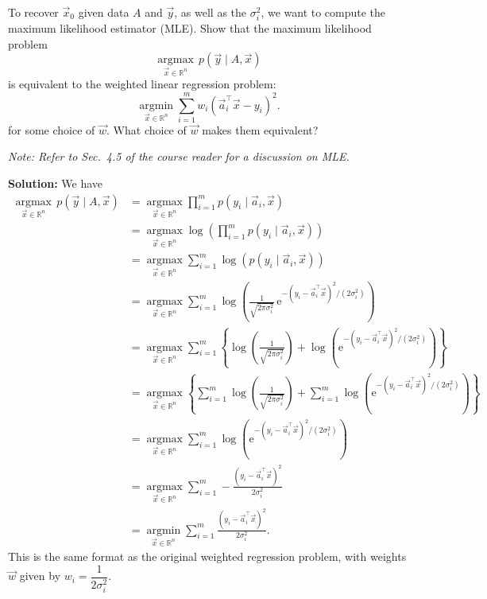 \documentclass[10pt]{article}
\newcommand{\RR}{\mathbb{R}}
\begin{document}
\begin{enumerate}[label=(\alph*)]
    To recover $\vec{x}_0$ given data $A$ and $\vec{y}$, as well as the $\sigma_i^2$, we want to compute the maximum likelihood estimator (MLE). Show that the maximum likelihood problem
    \begin{equation}
        \operatorname*{argmax}_{\vec{x} \in \RR^n}\, p(\vec{y} \mid A, \vec{x})
    \end{equation}
    is equivalent to the weighted linear regression problem:
    \begin{equation}
        \operatorname*{argmin}_{\vec{x} \in \RR^n} \sum_{i=1}^{m} w_i (\vec{a}_i^\top \vec{x} - y_i)^2.
    \end{equation}
    for some choice of $\vec{w}$. What choice of $\vec{w}$ makes them equivalent?

    \emph{Note: Refer to Sec.~4.5 of the course reader for a discussion on MLE.}

    \textbf{Solution:} We have
    \begin{align}
        \operatorname*{argmax}_{\vec{x} \in \RR^n}\, p(\vec{y} \mid A, \vec{x})
        &= \operatorname*{argmax}_{\vec{x} \in \RR^n} \prod_{i=1}^{m} p(y_i \mid \vec{a}_i, \vec{x}) \\
        &= \operatorname*{argmax}_{\vec{x} \in \RR^n} \log \left( \prod_{i=1}^{m} p(y_i \mid \vec{a}_i, \vec{x}) \right) \\
        &= \operatorname*{argmax}_{\vec{x} \in \RR^n} \sum_{i=1}^{m} \log(p(y_i \mid \vec{a}_i, \vec{x})) \\
        &= \operatorname*{argmax}_{\vec{x} \in \RR^n} \sum_{i=1}^{m} \log\!\left( \frac{1}{\sqrt{2\pi\sigma_i^2}}\, \mathrm{e}^{-(y_i - \vec{a}_i^\top \vec{x})^2 / (2\sigma_i^2)} \right) \\
        &= \operatorname*{argmax}_{\vec{x} \in \RR^n} \sum_{i=1}^{m} \left\{ \log\!\left( \frac{1}{\sqrt{2\pi\sigma_i^2}} \right) + \log\!\left( \mathrm{e}^{-(y_i - \vec{a}_i^\top \vec{x})^2 / (2\sigma_i^2)} \right) \right\} \\
        &= \operatorname*{argmax}_{\vec{x} \in \RR^n} \left\{ \sum_{i=1}^{m} \log\!\left( \frac{1}{\sqrt{2\pi\sigma_i^2}} \right) + \sum_{i=1}^{m} \log\!\left( \mathrm{e}^{-(y_i - \vec{a}_i^\top \vec{x})^2 / (2\sigma_i^2)} \right) \right\} \\
        &= \operatorname*{argmax}_{\vec{x} \in \RR^n} \sum_{i=1}^{m} \log\!\left( \mathrm{e}^{-(y_i - \vec{a}_i^\top \vec{x})^2 / (2\sigma_i^2)} \right) \\
        &= \operatorname*{argmax}_{\vec{x} \in \RR^n} \sum_{i=1}^{m} -\frac{(y_i - \vec{a}_i^\top \vec{x})^2}{2\sigma_i^2} \\
        &= \operatorname*{argmin}_{\vec{x} \in \RR^n} \sum_{i=1}^{m} \frac{(y_i - \vec{a}_i^\top \vec{x})^2}{2\sigma_i^2}.
    \end{align}
    This is the same format as the original weighted regression problem, with weights $\vec{w}$ given by $w_i = \dfrac{1}{2\sigma_i^2}$.


\end{enumerate}
\end{document}
